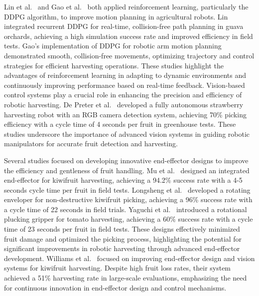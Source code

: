 \documentclass[a4paper,fleqn]{cas-dc}
\begin{document}
Lin et al.~\cite{lin2021collision} and Gao et al.~\cite{gao2020multi} both applied reinforcement learning, particularly the DDPG algorithm, to improve motion planning in agricultural robots. Lin integrated recurrent DDPG for real-time, collision-free path planning in guava orchards, achieving a high simulation success rate and improved efficiency in field tests. Gao's implementation of DDPG for robotic arm motion planning demonstrated smooth, collision-free movements, optimizing trajectory and control strategies for efficient harvesting operations. These studies highlight the advantages of reinforcement learning in adapting to dynamic environments and continuously improving performance based on real-time feedback.
Vision-based control systems play a crucial role in enhancing the precision and efficiency of robotic harvesting. 
De Preter et al.~\cite{de2018development} developed a fully autonomous strawberry harvesting robot with an RGB camera detection system, achieving 70\% picking efficiency with a cycle time of 4 seconds per fruit in greenhouse tests. These studies underscore the importance of advanced vision systems in guiding robotic manipulators for accurate fruit detection and harvesting.

Several studies focused on developing innovative end-effector designs to improve the efficiency and gentleness of fruit handling. Mu et al.~\cite{mu2020design} designed an integrated end-effector for kiwifruit harvesting, achieving a 94.2\% success rate with a 4-5 seconds cycle time per fruit in field tests. Longsheng et al.~\cite{longsheng2015development} developed a rotating enveloper for non-destructive kiwifruit picking, achieving a 96\% success rate with a cycle time of 22 seconds in field trials. Yaguchi et al.~\cite{yaguchi2016development} introduced a rotational plucking gripper for tomato harvesting, achieving a 60\% success rate with a cycle time of 23 seconds per fruit in field tests. These designs effectively minimized fruit damage and optimized the picking process, highlighting the potential for significant improvements in robotic harvesting through advanced end-effector development.
Williams et al.~\cite{williams2020improvements} focused on improving end-effector design and vision systems for kiwifruit harvesting. Despite high fruit loss rates, their system achieved a 51\% harvesting rate in large-scale evaluations, emphasizing the need for continuous innovation in end-effector design and control mechanisms.
\end{document}
